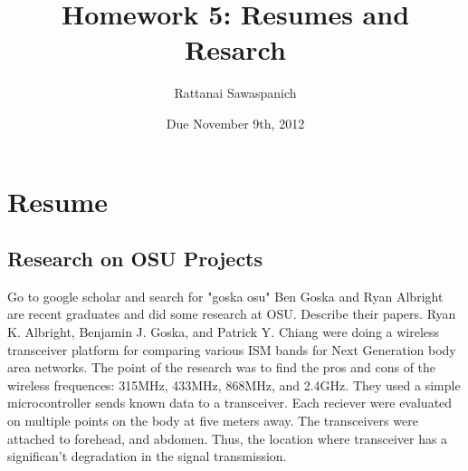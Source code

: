 \documentclass{article}
\title{Homework 5: Resumes and Resarch}
\author{Rattanai Sawaspanich}
\date{Due November 9th, 2012}
\begin{document}
\maketitle
{}

\section{Resume}


\subsection{Research on OSU Projects}
Go to google scholar and search for "goska osu"  Ben Goska and Ryan Albright are recent graduates and did some research at OSU.  Describe their papers.\newline \newline
\indent  Ryan K. Albright, Benjamin J. Goska, and Patrick Y. Chiang were doing a  wireless transceiver platform for comparing various ISM bands for Next Generation body area networks.  The point of the research was to find the pros and cons of the wireless frequences: 315MHz, 433MHz, 868MHz, and 2.4GHz.  They used a simple microcontroller sends known data to a transceiver. Each reciever were evaluated on multiple points on the body at five meters away.  The transceivers were attached to forehead, and abdomen.  Thus, the location where transceiver has a significan't degradation in the signal transmission.
\end{document}
